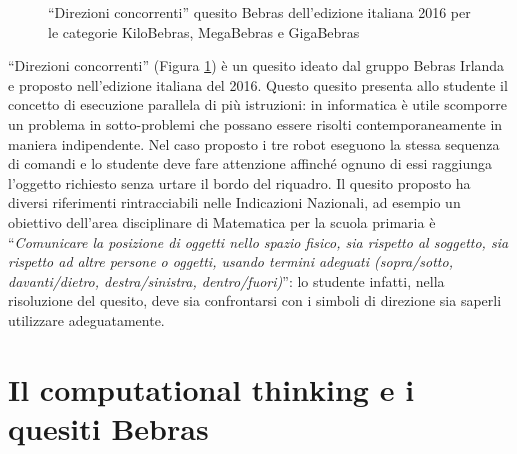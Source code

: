 \documentclass[12pt]{report}
\begin{document}
\bigskip
\begin{figure}[h]
	\centering
	\caption{``Direzioni concorrenti'' quesito Bebras dell'edizione italiana 2016 per le categorie KiloBebras, MegaBebras e GigaBebras}\label{fig:direzioni}
\end{figure}

``Direzioni concorrenti'' (Figura \ref{fig:direzioni}) è un quesito ideato dal gruppo Bebras Irlanda e proposto nell'edizione italiana del 2016. Questo quesito presenta allo studente il concetto di esecuzione parallela di più istruzioni: in informatica è utile scomporre un problema in sotto-problemi che possano essere risolti contemporaneamente in maniera indipendente. Nel caso proposto i tre robot eseguono la stessa sequenza di comandi e lo studente deve fare attenzione affinché ognuno di essi raggiunga l'oggetto richiesto senza urtare il bordo del riquadro.
Il quesito proposto ha diversi riferimenti rintracciabili nelle Indicazioni Nazionali, ad esempio un obiettivo dell'area disciplinare di Matematica per la scuola primaria è ``\textit{Comunicare la posizione di oggetti nello spazio fisico, sia rispetto al soggetto, sia rispetto ad altre persone o oggetti, usando termini adeguati (sopra/sotto, davanti/dietro, destra/sinistra, dentro/fuori)}'': lo studente infatti, nella risoluzione del quesito, deve sia confrontarsi con i simboli di direzione sia saperli utilizzare adeguatamente. 


\chapter{Il computational thinking e i quesiti Bebras}
\label{cap3}
\end{document}
